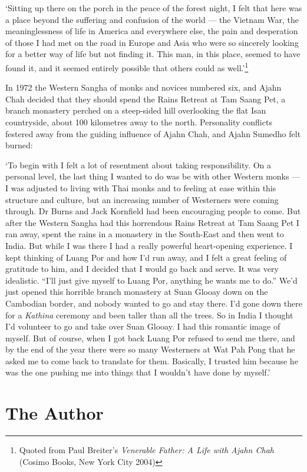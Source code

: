 `Sitting up there on the porch in the peace of the forest night, I felt
that here was a place beyond the suffering and confusion of the world
--- the Vietnam War, the meaninglessness of life in America and
everywhere else, the pain and desperation of those I had met on the road
in Europe and Asia who were so sincerely looking for a better way of
life but not finding it. This man, in this place, seemed to have found
it, and it seemed entirely possible that others could as
well.'\footnote{Quoted from Paul Breiter's \emph{Venerable Father: A
  Life with Ajahn Chah} (Cosimo Books, New York City 2004)}

In 1972 the Western Sangha of monks and novices numbered six, and Ajahn
Chah decided that they should spend the Rains Retreat at Tam Saang Pet,
a branch monastery perched on a steep-sided hill overlooking the flat
Isan countryside, about 100 kilometres away to the north. Personality
conflicts festered away from the guiding influence of Ajahn Chah, and
Ajahn Sumedho felt burned:

`To begin with I felt a lot of resentment about taking responsibility.
On a personal level, the last thing I wanted to do was be with other
Western monks --- I was adjusted to living with Thai monks and to
feeling at ease within this structure and culture, but an increasing
number of Westerners were coming through. Dr Burns and Jack Kornfield
had been encouraging people to come. But after the Western Sangha had
this horrendous Rains Retreat at Tam Saang Pet I ran away, spent the
rains in a monastery in the South-East and then went to India. But while
I was there I had a really powerful heart-opening experience. I kept
thinking of Luang Por and how I'd run away, and I felt a great feeling
of gratitude to him, and I decided that I would go back and serve. It
was very idealistic. ``I'll just give myself to Luang Por, anything he
wants me to do.'' We'd just opened this horrible branch monastery at
Suan Glooay down on the Cambodian border, and nobody wanted to go and
stay there. I'd gone down there for a \emph{Kathina} ceremony and been
taller than all the trees. So in India I thought I'd volunteer to go and
take over Suan Glooay. I had this romantic image of myself. But of
course, when I got back Luang Por refused to send me there, and by the
end of the year there were so many Westerners at Wat Pah Pong that he
asked me to come back to translate for them. Basically, I trusted him
because he was the one pushing me into things that I wouldn't have done
by myself.'

\section{The Author}

